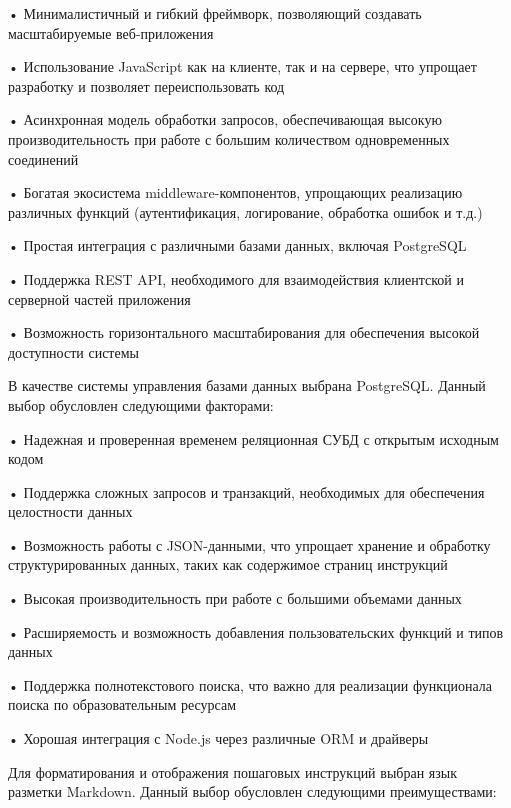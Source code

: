 {  \par \redline • Минималистичный и гибкий фреймворк, позволяющий создавать масштабируемые веб-приложения
  \par \redline • Использование JavaScript как на клиенте, так и на сервере, что упрощает разработку и позволяет переиспользовать код
  \par \redline • Асинхронная модель обработки запросов, обеспечивающая высокую производительность при работе с большим количеством одновременных соединений
  \par \redline • Богатая экосистема middleware-компонентов, упрощающих реализацию различных функций (аутентификация, логирование, обработка ошибок и т.д.)
  \par \redline • Простая интеграция с различными базами данных, включая PostgreSQL
  \par \redline • Поддержка REST API, необходимого для взаимодействия клиентской и серверной частей приложения
  \par \redline • Возможность горизонтального масштабирования для обеспечения высокой доступности системы

  \par \redline В качестве системы управления базами данных выбрана PostgreSQL. Данный выбор обусловлен следующими факторами:
  
  \par \redline • Надежная и проверенная временем реляционная СУБД с открытым исходным кодом
  \par \redline • Поддержка сложных запросов и транзакций, необходимых для обеспечения целостности данных
  \par \redline • Возможность работы с JSON-данными, что упрощает хранение и обработку структурированных данных, таких как содержимое страниц инструкций
  \par \redline • Высокая производительность при работе с большими объемами данных
  \par \redline • Расширяемость и возможность добавления пользовательских функций и типов данных
  \par \redline • Поддержка полнотекстового поиска, что важно для реализации функционала поиска по образовательным ресурсам
  \par \redline • Хорошая интеграция с Node.js через различные ORM и драйверы

  \par \redline Для форматирования и отображения пошаговых инструкций выбран язык разметки Markdown. Данный выбор обусловлен следующими преимуществами:
  
}

